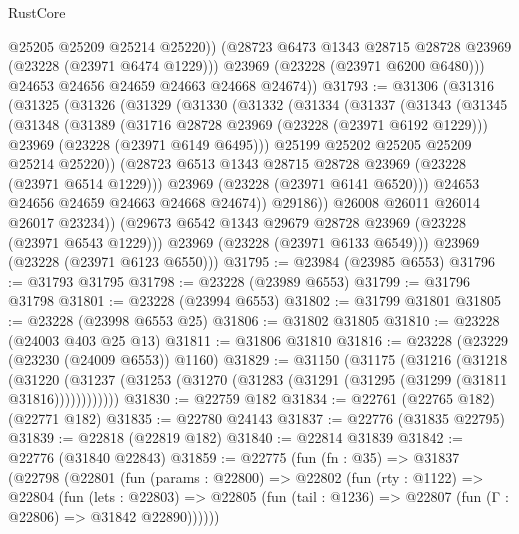 \begin{lexlean}{RustCore}
\begin{coremodule}
              @25205
              @25209
              @25214
              @25220))
          (@28723 @6473 @1343 @28715 @28728 @23969 (@23228 (@23971 @6474 @1229)))
          @23969
          (@23228 (@23971 @6200 @6480)))
        @24653
        @24656
        @24659
        @24663
        @24668
        @24674))
@31793 := @31306
    (@31316
      (@31325
        (@31326
          (@31329
            (@31330
              (@31332
                (@31334
                  (@31337
                    (@31343
                      (@31345
                        (@31348
                          (@31389
                            (@31716 @28728 @23969 (@23228 (@23971 @6192 @1229)))
                            @23969
                            (@23228 (@23971 @6149 @6495)))
                          @25199
                          @25202
                          @25205
                          @25209
                          @25214
                          @25220))
                      (@28723 @6513 @1343 @28715 @28728 @23969 (@23228 (@23971 @6514 @1229)))
                      @23969
                      (@23228 (@23971 @6141 @6520)))
                    @24653
                    @24656
                    @24659
                    @24663
                    @24668
                    @24674))
                @29186))
            @26008
            @26011
            @26014
            @26017
            @23234))
        (@29673 @6542 @1343 @29679 @28728 @23969 (@23228 (@23971 @6543 @1229)))
        @23969
        (@23228 (@23971 @6133 @6549)))
      @23969
      (@23228 (@23971 @6123 @6550)))
@31795 := @23984 (@23985 @6553)
@31796 := @31793 @31795
@31798 := @23228 (@23989 @6553)
@31799 := @31796 @31798
@31801 := @23228 (@23994 @6553)
@31802 := @31799 @31801
@31805 := @23228 (@23998 @6553 @25)
@31806 := @31802 @31805
@31810 := @23228 (@24003 @403 @25 @13)
@31811 := @31806 @31810
@31816 := @23228 (@23229 (@23230 (@24009 @6553)) @1160)
@31829 := @31150
    (@31175
      (@31216
        (@31218
          (@31220 (@31237 (@31253 (@31270 (@31283 (@31291 (@31295 (@31299 (@31811 @31816))))))))))))
@31830 := @22759 @182
@31834 := @22761 (@22765 @182) (@22771 @182)
@31835 := @22780 @24143
@31837 := @22776 (@31835 @22795)
@31839 := @22818 (@22819 @182)
@31840 := @22814 @31839
@31842 := @22776 (@31840 @22843)
@31859 := @22775
    (fun (fn : @35) =>
    @31837
      (@22798
        (@22801
          (fun (params : @22800) =>
          @22802
            (fun (rty : @1122) =>
            @22804
              (fun (lets : @22803) =>
              @22805 (fun (tail : @1236) => @22807 (fun (Γ : @22806) => @31842 @22890))))))

\end{coremodule}
\end{lexlean}
